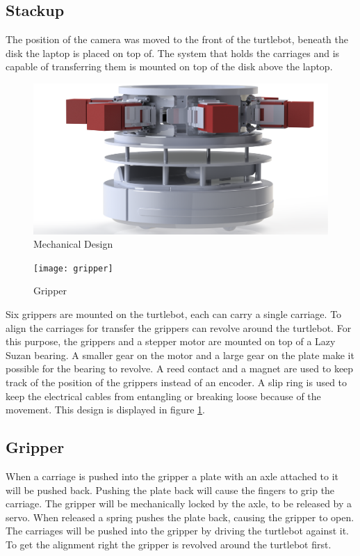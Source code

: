 \documentclass[10pt, journal]{IEEEtran}
\begin{document}
\subsection{Stackup}
The position of the camera was moved to the front of the turtlebot, beneath the disk the laptop is placed on top of. The system that holds the carriages and is capable of transferring them is mounted on top of the disk above the laptop.
\begin{figure}[htp]
\centering
\includegraphics[width=\columnwidth]{turtle_design}
\caption{Mechanical Design}
\label{MechanicalDesign}
\end{figure}
\begin{figure}[htp]
\centering
\texttt{[image: gripper]}
\caption{Gripper}
\label{Gripper}
\end{figure}
Six grippers are mounted on the turtlebot, each can carry a single carriage. To align the carriages for transfer the grippers can revolve around the turtlebot. For this purpose, the grippers and a stepper motor are mounted on top of a Lazy Suzan bearing. A smaller gear on the motor and a large gear on the plate make it possible for the bearing to revolve. A reed contact and a magnet are used to keep track of the position of the grippers instead of an encoder. A slip ring is used to keep the electrical cables from entangling or breaking loose because of the movement. This design is displayed in figure \ref{MechanicalDesign}.

\subsection{Gripper}
When a carriage is pushed into the gripper a plate with an axle attached to it will be pushed back. Pushing the plate back will cause the fingers to grip the carriage. The gripper will be mechanically locked by the axle, to be released by a servo. When released a spring pushes the plate back, causing the gripper to open. The carriages will be pushed into the gripper by driving the turtlebot against it. To get the alignment right the gripper is revolved around the turtlebot first.
\end{document}
